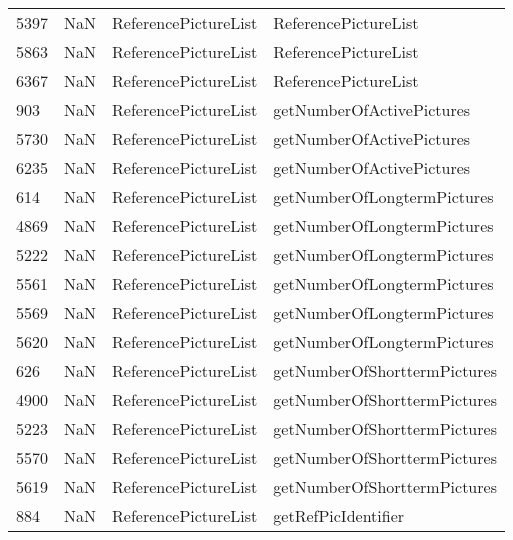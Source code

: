 \begin{tabular}{llll}
5397 &                   NaN &       ReferencePictureList &                      ReferencePictureList \\
5863 &                   NaN &       ReferencePictureList &                      ReferencePictureList \\
6367 &                   NaN &       ReferencePictureList &                      ReferencePictureList \\
903  &                   NaN &       ReferencePictureList &                 getNumberOfActivePictures \\
5730 &                   NaN &       ReferencePictureList &                 getNumberOfActivePictures \\
6235 &                   NaN &       ReferencePictureList &                 getNumberOfActivePictures \\
614  &                   NaN &       ReferencePictureList &               getNumberOfLongtermPictures \\
4869 &                   NaN &       ReferencePictureList &               getNumberOfLongtermPictures \\
5222 &                   NaN &       ReferencePictureList &               getNumberOfLongtermPictures \\
5561 &                   NaN &       ReferencePictureList &               getNumberOfLongtermPictures \\
5569 &                   NaN &       ReferencePictureList &               getNumberOfLongtermPictures \\
5620 &                   NaN &       ReferencePictureList &               getNumberOfLongtermPictures \\
626  &                   NaN &       ReferencePictureList &              getNumberOfShorttermPictures \\
4900 &                   NaN &       ReferencePictureList &              getNumberOfShorttermPictures \\
5223 &                   NaN &       ReferencePictureList &              getNumberOfShorttermPictures \\
5570 &                   NaN &       ReferencePictureList &              getNumberOfShorttermPictures \\
5619 &                   NaN &       ReferencePictureList &              getNumberOfShorttermPictures \\
884  &                   NaN &       ReferencePictureList &                       getRefPicIdentifier \\

\end{tabular}
